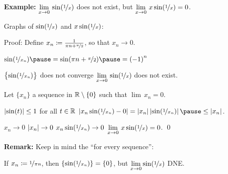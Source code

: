 \documentclass[10pt,aspectratio=169]{beamer}
\begin{document}
\begin{frame}

\textbf{Example:}
$\displaystyle \lim_{x \to 0} \, \sin( \nicefrac{1}{x} )$
does not exist, but 
$\displaystyle \lim_{x \to 0} \, x\sin( \nicefrac{1}{x} ) = 0$.

\pause
\medskip

Graphs of $\sin(\nicefrac{1}{x})$ and $x \sin(\nicefrac{1}{x})$:

\medskip


\pause
\medskip

Proof:
Define
$x_n \coloneqq \frac{1}{\pi n + \nicefrac{\pi}{2}}$, so that $x_n \to 0$.

\pause
\thus \quad $\sin ( \nicefrac{1}{x_n} )
\pause
=
\sin (\pi n + \nicefrac{\pi}{2})
\pause
= {(-1)}^n$

\pause
\thus \quad $\bigl\{ \sin ( \nicefrac{1}{x_n} ) \bigr\}$ does not converge
\pause
\wthus
$\displaystyle \lim_{x \to 0} \, \sin( \nicefrac{1}{x} )$ does not exist.

\pause
\medskip

Let $\{ x_n \}$ a sequence in ${\mathbb{R}} \setminus \{ 0 \}$ such that $\lim\, x_n = 0$.

\pause
$\left\lvert {\sin(t)} \right\rvert \leq 1$ for all $t \in {\mathbb{R}}$
\pause
\quad \thus \quad
$
\abs{x_n\sin(\nicefrac{1}{x_n})-0}
=
\abs{x_n}\abs{\sin(\nicefrac{1}{x_n})}
\pause
\leq
\abs{x_n}$.

\pause
\medskip

$x_n \to 0$
\pause
\wthus
$\left\lvert {x_n} \right\rvert \to 0$
\pause
\wthus
$x_n\sin(\nicefrac{1}{x_n}) \to 0$
\pause
\wthus
$\displaystyle \lim_{x \to 0} \, x\sin( \nicefrac{1}{x} ) = 0$.
\qed

\pause
\medskip

\textbf{Remark:} Keep
in mind the ``for every sequence'':

\pause
If $x_n \coloneqq \nicefrac{1}{\pi n}$, then
$\{ \sin (\nicefrac{1}{x_n}) \} = \{ 0 \}$, but $\displaystyle \lim_{x\to 0}
\sin(\nicefrac{1}{x})$ DNE.
\end{frame}
\end{document}
